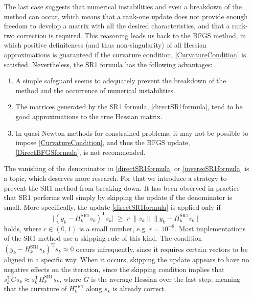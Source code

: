 The last case suggests that numerical instabilities and even a breakdown of the method can occur, which means that a rank-one update does not provide enough freedom to develop a matrix with all the desired characteristics, and that a rank-two correction is required. This reasoning leads us back to the BFGS method, in which positive definiteness (and thus non-singularity) of all Hessian approximations is guaranteed if the curvature condition, \cref{CurvatureCondition} is satisfied. Nevertheless, the SR1 formula has the following advantages:
\begin{enumerate}
    \item A simple safeguard seems to adequately prevent the breakdown of the method and the occurrence of numerical instabilities.
    \item The matrices generated by the SR1 formula, \cref{directSR1formula}, tend to be good approximations to the true Hessian matrix.
    \item In quasi-Newton methods for constrained problems, it may not be possible to impose \cref{CurvatureCondition}, and thus the BFGS update, \cref{DirectBFGSformula}, is not recommended. 
\end{enumerate}
The vanishing of the denominator in \cref{directSR1formula} or \cref{inverseSR1formula} is a topic, which deserves more research. For that we introduce a strategy to prevent the SR1 method from breaking down. It has been observed in practice that SR1 performs well simply by skipping the update if the denominator is small. More specifically, the update \cref{directSR1formula} is applied only if 
\begin{equation}\label{CautiousSR1}
    \lvert (y_k - H^\mathrm{SR1}_k s_k)^{\mathrm{T}} s_k \lvert \; \geq \; r \; \lVert s_k \rVert \lVert y_k - H^\mathrm{SR1}_k s_k \rVert 
\end{equation}
holds, where $r \in (0, 1)$ is a small number, e.g. $r = 10^{−8}$. Most implementations of the SR1 method use a skipping rule of this kind. The condition $(y_k - H^\mathrm{SR1}_k s_k)^{\mathrm{T}} s_k \approx 0$ occurs infrequently, since it requires certain vectors to be aligned in a specific way. When it occurs, skipping the update appears to have no negative effects on the iteration, since the skipping condition implies that $s^{\mathrm{T}}_k \tilde{G} s_k \approx s^{\mathrm{T}}_k H^\mathrm{SR1}_k s_k$, where $\tilde{G}$ is the average Hessian over the last step, meaning that the curvature of $H^\mathrm{SR1}_k$ along $s_k$ is already correct. \\

